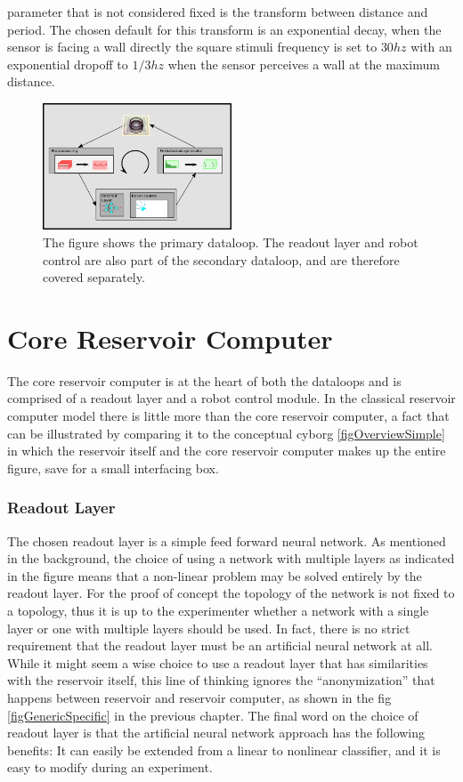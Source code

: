 parameter that is not considered fixed is the transform between distance and
period.
The chosen default for this transform is an exponential decay, when the sensor
is facing a wall directly the square stimuli frequency is set to $30hz$ with an
exponential dropoff to $1/3hz$ when the sensor perceives a wall at the maximum
distance.
\begin{figure}[h!]
  \centering
  \includegraphics[width=0.5\textwidth]{fig/rcLoop.png}
  \caption{
    The figure shows the primary dataloop.
    The readout layer and robot control are also part of the secondary dataloop,
    and are therefore covered separately.
  }
  \label{figDataLoop}
\end{figure}
%
\section{Core Reservoir Computer}
The core reservoir computer is at the heart of both the dataloops and is
comprised of a readout layer and a robot control module.
In the classical reservoir computer model there is little more than the core
reservoir computer, a fact that can be illustrated by comparing it to the
conceptual cyborg \ref{figOverviewSimple} in which the reservoir itself and the
core reservoir computer makes up the entire figure, save for a small interfacing box.
\subsubsection{Readout Layer}
The chosen readout layer is a simple feed forward neural network.
As mentioned in the background, the choice of using a network with multiple
layers as indicated in the figure means that a non-linear problem may be solved
entirely by the readout layer.
For the proof of concept the topology of the network is not fixed to a topology,
thus it is up to the experimenter whether a network with a single layer or one
with multiple layers should be used.
In fact, there is no strict requirement that the readout layer must be an
artificial neural network at all.
While it might seem a wise choice to use a readout layer that has similarities
with the reservoir itself, this line of thinking ignores the ``anonymization''
that happens between reservoir and reservoir computer, as shown in the fig
\ref{figGenericSpecific} in the previous chapter.
The final word on the choice of readout layer is that the artificial neural
network approach has the following benefits:
It can easily be extended from a linear to nonlinear classifier, and it is easy
to modify during an experiment.
